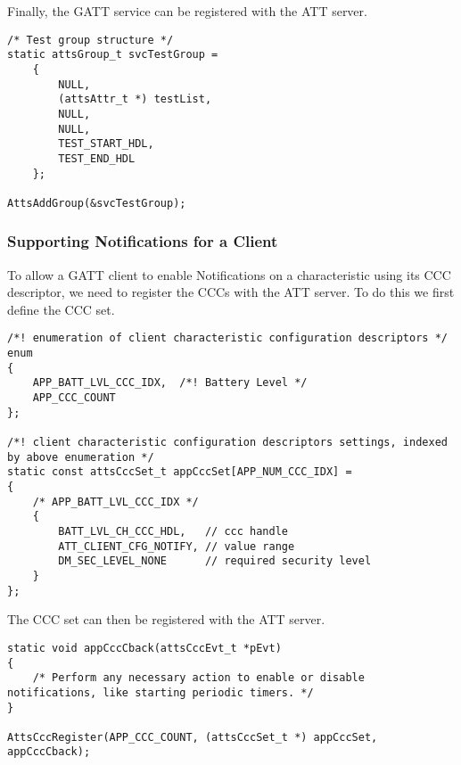 Finally, the GATT service can be registered with the ATT server.
\begin{lstlisting}
/* Test group structure */
static attsGroup_t svcTestGroup =
    {
        NULL,
        (attsAttr_t *) testList,
        NULL,
        NULL,
        TEST_START_HDL,
        TEST_END_HDL
    };
    
AttsAddGroup(&svcTestGroup);
\end{lstlisting}

\subsubsection{Supporting Notifications for a Client}
To allow a GATT client to enable Notifications on a characteristic using its CCC descriptor, we need to register the CCCs with the ATT server. To do this we first define the CCC set.
\begin{lstlisting}
/*! enumeration of client characteristic configuration descriptors */
enum
{
    APP_BATT_LVL_CCC_IDX,  /*! Battery Level */
    APP_CCC_COUNT
};

/*! client characteristic configuration descriptors settings, indexed by above enumeration */
static const attsCccSet_t appCccSet[APP_NUM_CCC_IDX] =
{
    /* APP_BATT_LVL_CCC_IDX */
    {
        BATT_LVL_CH_CCC_HDL,   // ccc handle
        ATT_CLIENT_CFG_NOTIFY, // value range
        DM_SEC_LEVEL_NONE      // required security level
    }   
};
\end{lstlisting}
The CCC set can then be registered with the ATT server.
\begin{lstlisting}
static void appCccCback(attsCccEvt_t *pEvt)
{
    /* Perform any necessary action to enable or disable notifications, like starting periodic timers. */
}

AttsCccRegister(APP_CCC_COUNT, (attsCccSet_t *) appCccSet, appCccCback);
\end{lstlisting}

